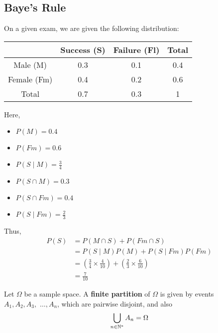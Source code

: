 \documentclass{article}
\begin{document}
\subsection{Baye's Rule}
	\begin{exmp}
		On a given exam, we are given the following distribution:
		\begin{table}[h]
			\begin{tabular}{c|c|c|c}
				& Success (S) & Failure (Fl) & Total \\ \hline
				Male (M)   & 0.3         & 0.1         & 0.4   \\ \hline
				Female (Fm) & 0.4         & 0.2         & 0.6   \\ \hline
				Total      & 0.7         & 0.3         & 1    
			\end{tabular}
		\end{table}
		Here,
		\begin{center}
			\begin{multicols}{2} 
				\begin{itemize}
					\item $P(M) = 0.4$
					\item $P(Fm) = 0.6$
					\item $P(S \mid M) = \frac34$
					\item $P(S \cap M)=0.3$
					\item $P(S \cap Fm)=0.4$
					\item $P(S \mid Fm) = \frac23$
				\end{itemize}
			\end{multicols}
		\end{center}
		Thus, 
		\begin{align*}
			P(S) &= P(M \cap S) + P(Fm\cap S)  \\
			&= P (S \mid M) P(M) + P (S \mid Fm) P(Fm) \\
			&= \left( \frac34 \times \frac{4}{10} \right) + \left( \frac23 \times \frac{6}{10} \right)\\
			&\boxed{= \frac{7}{10}} 
		\end{align*}
	\end{exmp}
	\begin{defn}
		Let $\Omega$ be a sample space. A \textbf{finite partition } of $\Omega$ is given by events $A_1, A_2, A_3, \,\, \dots, A_n$, which are pairwise disjoint, and also 
		$$ \bigcup_{n \in \mathbb{N}^*} A_n= \Omega $$
	\end{defn}
	\begin{figure}[h]
	\end{figure}
	
\end{document}
